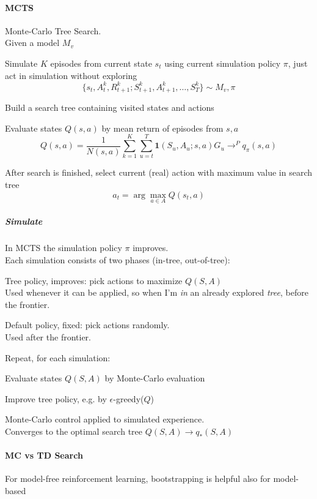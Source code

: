 \documentclass[10pt]{report}
\begin{document}
\paragraph{MCTS} Monte-Carlo Tree Search.\\
Given a model $M_v$
\begin{list}{}{}
	\item Simulate $K$ episodes from current state $s_t$ using current simulation policy $\pi$, just act in simulation without exploring
	$$\{s_t,A_t^k,R_{t+1}^k;S_{t+1}^k,A_{t+1}^k,\ldots,S_T^k\}\sim M_v,\pi$$
	\item Build a search tree containing visited states and actions
	\item Evaluate states $Q(s,a)$ by mean return of episodes from $s,a$
	$$Q(s,a)=\frac{1}{N(s,a)}\sum_{k=1}^K\sum_{u=t}^T\mathbf{1}(S_u,A_u;s,a) G_u\rightarrow^P q_\pi(s,a)$$
\end{list}
After search is finished, select current (real) action with maximum value in search tree
$$a_t=\arg\max_{a\in A} Q(s_t,a)$$
\subparagraph{Simulate} In MCTS the simulation policy $\pi$ improves.\\
Each simulation consists of two phases (in-tree, out-of-tree):
\begin{list}{}{}
	\item Tree policy, improves: pick actions to maximize $Q(S,A)$\\
	Used whenever it can be applied, so when I'm \textit{in} an already explored \textit{tree}, before the frontier.
	\item Default policy, fixed: pick actions randomly.\\
	Used after the frontier.
\end{list}
Repeat, for each simulation:
\begin{list}{}{}
	\item Evaluate states $Q(S,A)$ by Monte-Carlo evaluation
	\item Improve tree policy, e.g. by $\epsilon$-greedy($Q$)
\end{list}
Monte-Carlo control applied to simulated experience.\\
Converges to the optimal search tree $Q(S,A)\rightarrow q_*(S,A)$
\paragraph{MC vs TD Search} For model-free reinforcement learning, bootstrapping is helpful %
also for model-based
\end{document}

